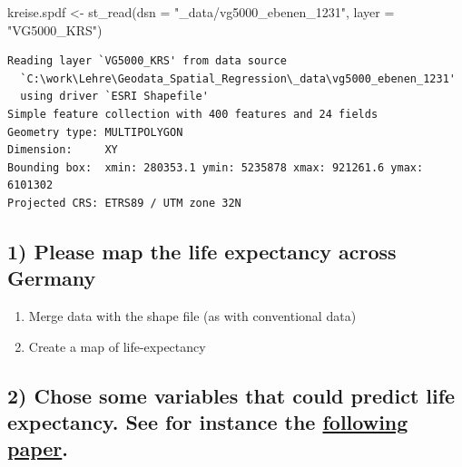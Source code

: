 \documentclass[
  letterpaper,
]{scrbook}
\newenvironment{Shaded}{\begin{snugshade}}{\end{snugshade}}
\newcommand{\AttributeTok}[1]{\textcolor[rgb]{0.40,0.45,0.13}{#1}}
\newcommand{\FunctionTok}[1]{\textcolor[rgb]{0.28,0.35,0.67}{#1}}
\newcommand{\NormalTok}[1]{\textcolor[rgb]{0.00,0.23,0.31}{#1}}
\newcommand{\OtherTok}[1]{\textcolor[rgb]{0.00,0.23,0.31}{#1}}
\newcommand{\StringTok}[1]{\textcolor[rgb]{0.13,0.47,0.30}{#1}}
\begin{document}
\begin{Shaded}
\begin{Highlighting}[]
\NormalTok{kreise.spdf }\OtherTok{\textless{}{-}} \FunctionTok{st\_read}\NormalTok{(}\AttributeTok{dsn =} \StringTok{"\_data/vg5000\_ebenen\_1231"}\NormalTok{,}
                       \AttributeTok{layer =} \StringTok{"VG5000\_KRS"}\NormalTok{)}
\end{Highlighting}
\end{Shaded}

\begin{verbatim}
Reading layer `VG5000_KRS' from data source 
  `C:\work\Lehre\Geodata_Spatial_Regression\_data\vg5000_ebenen_1231' 
  using driver `ESRI Shapefile'
Simple feature collection with 400 features and 24 fields
Geometry type: MULTIPOLYGON
Dimension:     XY
Bounding box:  xmin: 280353.1 ymin: 5235878 xmax: 921261.6 ymax: 6101302
Projected CRS: ETRS89 / UTM zone 32N
\end{verbatim}

\hypertarget{please-map-the-life-expectancy-across-germany}{%
\subsection*{1) Please map the life expectancy across
Germany}\label{please-map-the-life-expectancy-across-germany}}

\begin{enumerate}
\def\labelenumi{\alph{enumi})}
\item
  Merge data with the shape file (as with conventional data)
\item
  Create a map of life-expectancy
\end{enumerate}

\hypertarget{chose-some-variables-that-could-predict-life-expectancy.-see-for-instance-the-following-paper.}{%
\subsection*{\texorpdfstring{2) Chose some variables that could predict
life expectancy. See for instance the
\href{https://doi.org/10.1073/pnas.2003719117}{following
paper}.}{2) Chose some variables that could predict life expectancy. See for instance the following paper.}}\label{chose-some-variables-that-could-predict-life-expectancy.-see-for-instance-the-following-paper.}}
\end{document}
